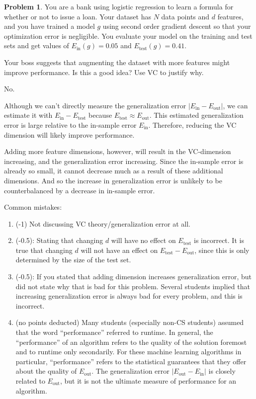 \documentclass[10pt]{exam}
\theoremstyle{definition}
\newtheorem{problem}{Problem}
\newcommand{\Ein}{E_{\text{in}}}
\newcommand{\Eout}{E_{\text{out}}}
\newcommand{\Etest}{E_{\text{test}}}
\begin{document}
\newpage
\begin{problem}
    You are a bank using logistic regression to learn a formula for whether or not to issue a loan.
    Your dataset has $N$ data points and $d$ features,
    and you have trained a model $g$ using second order gradient descent so that your optimization error is negligible.
    You evaluate your model on the training and test sets and get values of $\Ein(g)=0.05$ and $\Etest(g)=0.41$.

    Your boss suggests that augmenting the dataset with more features might improve performance.
    Is this a good idea?  Use VC to justify why.
\end{problem}
\begin{solution}
    No.

    Although we can't directly measure the generalization error $|\Ein - \Eout|$,
    we can estimate it with $\Ein-\Etest$ because $\Etest \approx \Eout$.
    This estimated generalization error is large relative to the in-sample error $\Ein$.
    Therefore, reducing the VC dimension will likely improve performance.

    Adding more feature dimensions, however, will result in the VC-dimension increasing, and the generalization error increasing.
    Since the in-sample error is already so small,
    it cannot decrease much as a result of these additional dimensions.
    And so the increase in generalization error is unlikely to be counterbalanced by a decrease in in-sample error.


    Common mistakes:
    \begin{enumerate}
        \item (-1) Not discussing VC theory/generalization error at all.
        \item (-0.5): Stating that changing $d$ will have no effect on $\Etest$ is incorrect.
            It is true that changing $d$ will not have an effect on $\Etest-\Eout$, since this is only determined by the size of the test set.

        \item (-0.5): If you stated that adding dimension increases generalization error, but did not state why that is bad for this problem.
            Several students implied that increasing generalization error is always bad for every problem, and this is incorrect.

        \item (no points deducted) Many students (especially non-CS students) assumed that the word ``performance'' referred to runtime.
            In general, the ``performance'' of an algorithm refers to the quality of the solution foremost and to runtime only secondarily.
            For these machine learning algorithms in particular, ``performance'' refers to the statistical guarantees that they offer about the quality of $\Eout$.
            The generalization error $|\Eout-\Ein|$ is closely related to $\Eout$,
            but it is not the ultimate measure of performance for an algorithm.


\end{enumerate}
\end{solution}
\end{document}
